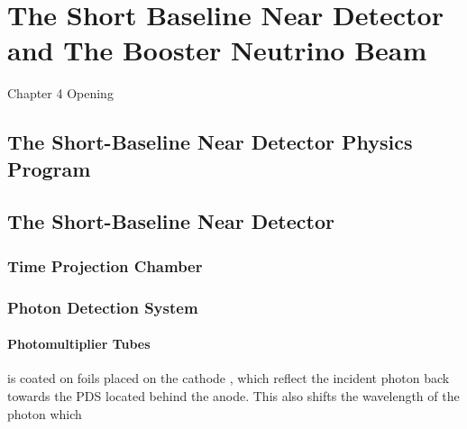 \chapter{The Short Baseline Near Detector and The Booster Neutrino Beam}

\ifpdf
    \graphicspath{{Chapter4/Figs/Raster/}{Chapter4/Figs/PDF/}{Chapter4/Figs/}}
\else
    \graphicspath{{Chapter4/Figs/Vector/}{Chapter4/Figs/}}
\fi


Chapter 4 Opening

\newpage
\section{The Short-Baseline Near Detector Physics Program}

\section{The Short-Baseline Near Detector}



\subsection{Time Projection Chamber}

\subsection{Photon Detection System}

\subsubsection{Photomultiplier Tubes}
is coated on foils placed on the cathode
, which reflect the incident photon back towards the PDS located behind the anode. 
This also shifts the wavelength of the photon which 

